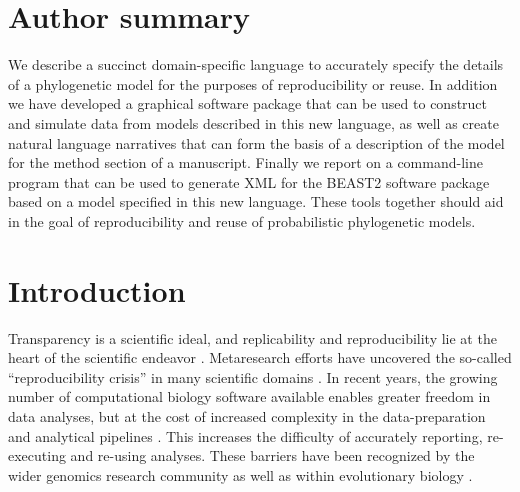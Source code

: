 \documentclass[10pt,letterpaper,table]{article}
\begin{document}
\section*{Author summary}
  We describe a succinct domain-specific language to accurately specify the details of a phylogenetic model for the purposes of reproducibility or reuse.
  In addition we have developed a graphical software package that can be used to construct and simulate data from models described in this new language, as well as create natural language narratives that can form the basis of a description of the model for the method section of a manuscript.
  Finally we report on a command-line program that can be used to generate XML for the BEAST2 software package based on a model specified in this new language.
  These tools together should aid in the goal of reproducibility and reuse of probabilistic phylogenetic models. 


\linenumbers

\section{Introduction}

Transparency is a scientific ideal, and replicability and
reproducibility lie at the heart of the scientific endeavor
\cite{nas19,munafo17}. 
Metaresearch efforts have uncovered the so-called ``reproducibility
crisis'' \cite{baker16} in many scientific domains \cite{baker16}. 
In recent years, the growing number of computational biology software available enables greater freedom in data analyses, 
but at the cost of increased complexity in the data-preparation and analytical pipelines \cite{eren2021community}. 
This increases the difficulty of accurately reporting, re-executing and re-using analyses. 
These barriers have been recognized by the wider genomics research community \cite{eren2021community} as well as within evolutionary biology \cite{oakley2014osiris}. 
\end{document}
